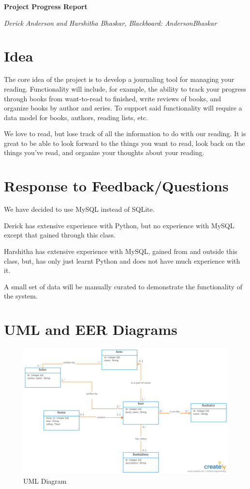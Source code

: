 \documentclass{article}
\begin{document}

\begin{center}
  \textbf{Project Progress Report}

  \textit{Derick Anderson and Harshitha Bhaskar, Blackboard: AndersonBhaskar}
\end{center}

\section*{Idea}

The core idea of the project is to develop a journaling tool for managing your
reading. Functionality will include, for example, the ability to track your
progress through books from want-to-read to finished, write reviews of books,
and organize books by author and series. To support said functionality will
require a data model for books, authors, reading lists, etc.

We love to read, but lose track of all the information to do with our
reading. It is great to be able to look forward to the things you want to read,
look back on the things you’ve read, and organize your thoughts about your
reading.

\section*{Response to Feedback/Questions}

We have decided to use MySQL instead of SQLite.

Derick has extensive experience with Python,
but no experience with MySQL
except that gained through this class.

Harshitha has extensive experience with MySQL, gained from and outside this class, 
but, has only just learnt Python and does not have much experience with it.

A small set of data will be manually curated to demonstrate the functionality of
the system.

\section*{UML and EER Diagrams}

\begin{figure}[h]
  \centering
  \includegraphics[width=\textwidth]{uml}
  \caption{UML Diagram}
\end{figure}
\end{document}
